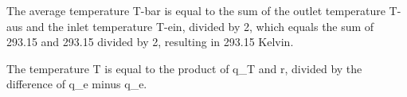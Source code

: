 The average temperature T-bar is equal to the sum of the outlet temperature T-aus and the inlet temperature T-ein, divided by 2, which equals the sum of 293.15 and 293.15 divided by 2, resulting in 293.15 Kelvin.

The temperature T is equal to the product of q_T and r, divided by the difference of q_e minus q_e.